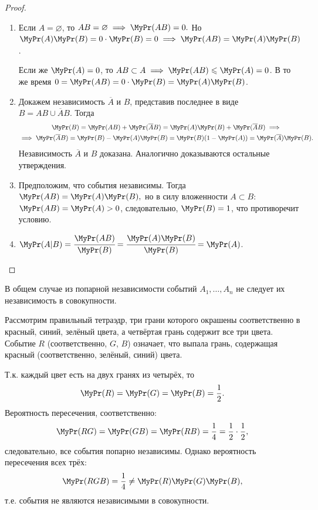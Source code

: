 \begin{proof}
	\begin{enumerate} 
		\item 
		      Если $A = \varnothing$, то $AB = \varnothing \implies \MyPr(AB) = 0.$ Но $ \MyPr(A)\MyPr(B) = 0 \cdot \MyPr(B) = 0 \implies \MyPr(AB) = \MyPr(A) \MyPr(B)$.
		              
		      Если же ${\MyPr(A) = 0}$, то ${AB \subset A \implies \MyPr(AB) \leqslant \MyPr(A) = 0}$. 
		      В то же время ${0 = \MyPr(AB) = 0 \cdot \MyPr(B) = \MyPr(A) \MyPr(B)}$.
		\item 
		      Докажем независимость $\overline{A}$ и $B$, представив последнее в виде \\
		      $B = AB \cup \overline{A}B$. Тогда
		      \begin{multline*}
		      	\MyPr(B) = \MyPr(AB) + \MyPr(\overline{A}B) = \MyPr(A)\MyPr(B) + \MyPr(\overline{A}B) \implies \\
                  \implies \MyPr(\overline{A}B) = \MyPr(B) - \MyPr(A)\MyPr(B) = \MyPr(B) (1 - \MyPr(A)) = \MyPr(\overline{A})\MyPr(B).
		      \end{multline*}
		      Независимость $\overline{A}$ и $B$ доказана. 
		      Аналогично доказываются остальные утверждения.
		\item
		      Предположим, что события независимы.
		      Тогда $\MyPr(AB) = \MyPr(A)\MyPr(B),$ но в силу вложенности $A \subset B$: $\MyPr(AB) = \MyPr(A) > 0$, следовательно, $\MyPr(B) = 1$, что противоречит условию.
		\item
		      $\MyPr(A | B) = \cfrac{\MyPr(AB)}{\MyPr(B)} = \cfrac{\MyPr(A)\MyPr(B)}{\MyPr(B)} = \MyPr(A)$.
		      \qedhere
	\end{enumerate}
\end{proof}

\begin{rmrk}
	В общем случае из попарной независимости событий $A_1, \ldots, A_n$ не следует их независимость в совокупности.
	\begin{exmp}
		Рассмотрим правильный тетраэдр, три грани которого окрашены соответственно в красный, синий, зелёный цвета, а четвёртая грань содержит все три цвета. 
		Событие $R$ (соответственно, $G$, $B$) означает, что выпала грань, содержащая красный (соответственно, зелёный, синий) цвета.
		
		Т.к. каждый цвет есть на двух гранях из четырёх, то
		\begin{equation*}
            \MyPr(R) = \MyPr(G) = \MyPr(B) = \frac{1}{2}.
		\end{equation*}
		Вероятность пересечения, соответственно:
		\begin{equation*}
            \MyPr(RG) = \MyPr(GB) = \MyPr(RB) = \frac{1}{4} = \frac{1}{2} \cdot \frac{1}{2},
		\end{equation*}
		следовательно, все события попарно независимы. 
		Однако вероятность пересечения всех трёх:
		\begin{equation*}
            \MyPr(RGB)  = \frac{1}{4} \neq \MyPr(R) \MyPr(G) \MyPr(B),
		\end{equation*}
		т.е. события не являются независимыми в совокупности. 
	\end{exmp}
\end{rmrk}


